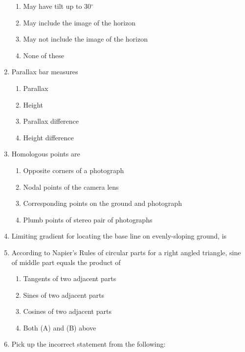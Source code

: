 \documentclass[11pt,a4paper]{article}
\begin{document}
\begin{enumerate}
\begin{enumerate}[label=\Alph*.]
\item{May have tilt up to 30$^\circ$}
\item{May include the image of the horizon}
\item{May not include the image of the horizon}
\item{None of these}
\end{enumerate}
\item{Parallax bar measures}
\begin{enumerate}[label=\Alph*.]
\item{Parallax}
\item{Height}
\item{Parallax difference}
\item{Height difference}
\end{enumerate}
\item{Homologous points are}
\begin{enumerate}[label=\Alph*.]
\item{Opposite corners of a photograph}
\item{Nodal points of the camera lens}
\item{Corresponding points on the ground and photograph}
\item{Plumb points of stereo pair of photographs}
\end{enumerate}
\item{Limiting gradient for locating the base line on evenly-sloping ground, is}
\\
\item{According to Napier's Rules of circular parts for a right angled triangle, sine of middle part equals the product of}
\begin{enumerate}[label=\Alph*.]
\item{Tangents of two adjacent parts}
\item{Sines of two adjacent parts}
\item{Cosines of two adjacent parts}
\item{Both (A) and (B) above}
\end{enumerate}
\item{Pick up the incorrect statement from the following:}

\end{enumerate}
\end{document}
